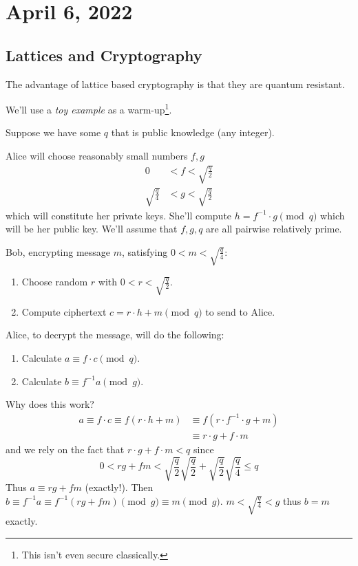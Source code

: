 \section{April 6, 2022}
\subsection{Lattices and Cryptography}
The advantage of lattice based cryptography is that they are quantum resistant.

We'll use a \emph{toy example} as a warm-up\footnote{This isn't even secure classically.}.
\begin{example}
    Suppose we have some $q$ that is public knowledge (any integer).

    Alice will choose reasonably small numbers $f, g$
    \begin{align*}
        0                  & < f < \sqrt{\frac{q}{2}} \\
        \sqrt{\frac{q}{4}} & < g < \sqrt{\frac{q}{2}}
    \end{align*}
    which will constitute her private keys. She'll compute $h = f^{-1}\cdot g\pmod{q}$ which will be her public key. We'll assume that $f, g, q$ are all pairwise relatively prime.

    Bob, encrypting message $m$, satisfying $0 < m < \sqrt{\frac{q}{4}}$:
    \begin{enumerate}
        \item Choose random $r$ with $0 < r < \sqrt{\frac{q}{2}}$.
        \item Compute ciphertext $c = r\cdot h + m\pmod{q}$ to send to Alice.
    \end{enumerate}

    Alice, to decrypt the message, will do the following:
    \begin{enumerate}
        \item Calculate $a \equiv f\cdot c\pmod{q}$.
        \item Calculate $b \equiv f^{-1}a\pmod{g}$.
    \end{enumerate}
    Why does this work?
    \begin{align*}
        a \equiv f\cdot c \equiv f(r\cdot h + m) & \equiv f(r\cdot f^{-1}\cdot g + m) \\
                                                 & \equiv r\cdot g + f\cdot m
    \end{align*}
    and we rely on the fact that $r\cdot g + f\cdot m < q$ since
    \[0 < rg + fm < \sqrt{\frac{q}{2}}\sqrt{\frac{q}{2}} + \sqrt{\frac{q}{2}}\sqrt{\frac{q}{4}} \leq q\]
    Thus $a\equiv rg + fm$ (exactly!). Then $b\equiv f^{-1}a\equiv f^{-1}(rg + fm)\pmod{g}\equiv m\pmod{g}$. $m < \sqrt{\frac{q}{4}} < g$ thus $b = m$ exactly.
\end{example}


